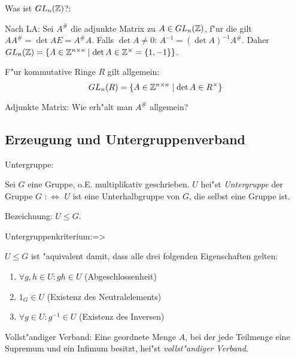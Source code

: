 \remark Was ist $GL_n(\mathbb Z)$?:{
  Nach LA: Sei $A^\#$ die adjunkte Matrix zu $A\in GL_n(\mathbb Z)$, f"ur die gilt
  $AA^\#=\det A E=A^\#A$. Falls $\det A\neq 0$: $A^{-1}=(\det A)^{-1} A^\#$.
  Daher $GL_n(\mathbb Z)=\{A\in\mathbb Z^{n\times n} \mid \operatorname{det} A\in\mathbb Z^\times=\{1,-1\} \}$.
  
  F"ur kommutative Ringe $R$ gilt allgemein:
  \[GL_n(R)=\{A\in\mathbb Z^{n\times n} \mid \operatorname{det} A\in R^\times\}
    \]
  }
\annotation Adjunkte Matrix:{
  Wie erh"alt man $A^\#$ allgemein?
  \missing
  }
\subsection{Erzeugung und Untergruppenverband}
 Untergruppe:{
  Sei $G$ eine Gruppe, o.E. multiplikativ geschrieben.
  $U$ hei"st \emph{Untergruppe} der Gruppe $G$ $:\iff$ $U$ ist
  eine Unterhalbgruppe von $G$, die selbst eine Gruppe ist.
  
  Bezeichnung: $U\leq G$.
  }
\lessertheorem Untergruppenkriterium:=>{
  $U\leq G$ ist "aquivalent damit, dass alle drei folgenden
  Eigenschaften gelten:
  \begin{enumerate}
    \item $\forall g,h\in U: gh\in U$ (Abgeschlossenheit)
    \item $1_G\in U$ (Existenz des Neutralelements)
    \item $\forall g\in U: g^{-1}\in U$ (Existenz des Inversen)
    \end{enumerate}
  }
 Vollst"andiger Verband:{
  Eine geordnete Menge $A$, bei der jede Teilmenge eine Supremum und
  ein Infimum besitzt, hei"st \emph{vollst"andiger Verband}.
  }
